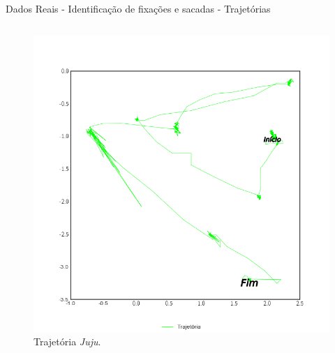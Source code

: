 \documentclass[10pt]{beamer}
\begin{document}
\begin{frame}{Dados Reais - Identificação de fixações e sacadas -  Trajetórias}
\begin{columns}
\begin{column}{0.48\textwidth}
\begin{figure}[H]
\begin{center}
                    \includegraphics[scale=0.25]{imagens/trajetoria_juju.png}
                    \caption{Trajetória \textit{Juju}.}
                \end{center}
            \end{figure}
        \end{column}
    \end{columns}
\end{frame}
\end{document}
